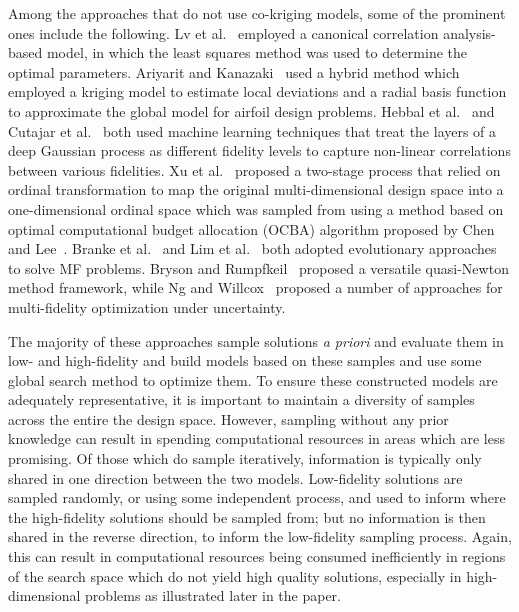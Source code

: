 Among the approaches that do not use co-kriging models, some of the prominent ones include the following. Lv et al.~\cite{lv2021multi} employed a canonical correlation analysis-based model, in which the least squares method was used to determine the optimal parameters. Ariyarit and Kanazaki~\cite{ariyarit2017multi} used a hybrid method which employed a kriging model to estimate local deviations and a radial basis function to approximate the global model for airfoil design problems. Hebbal et al.~\cite{hebbal2021multi} and Cutajar et al.~\cite{cutajar2019deep} both used machine learning techniques that treat the layers of a deep Gaussian process as different fidelity levels to capture non-linear correlations between various fidelities. Xu et al.~\cite{xu2016mo2tos} proposed a two-stage process that relied on ordinal transformation to map the original multi-dimensional design space into a one-dimensional ordinal space which was sampled from using a method based on optimal computational budget allocation (OCBA) algorithm proposed by Chen and Lee~\cite{chen2011stochastic}. Branke et al.~\cite{branke2016efficient} and Lim et al.~\cite{lim2008evolutionary} both adopted evolutionary approaches to solve MF problems. Bryson and Rumpfkeil~\cite{bryson2018multifidelity} proposed a versatile quasi-Newton method framework, while Ng and Willcox~\cite{ng2014multifidelity} proposed a number of approaches for multi-fidelity optimization under uncertainty.

The majority of these approaches sample solutions \emph{a priori} and evaluate them in low- and high-fidelity and build models based on these samples and use some global search method to optimize them. To ensure these constructed models are adequately representative, it is important to maintain a diversity of samples across the entire the design space. However, sampling without any prior knowledge can result in spending computational resources in areas which are less promising. Of those which do sample iteratively, information is typically only shared in one direction between the two models. Low-fidelity solutions are sampled randomly, or using some independent process, and used to inform where the high-fidelity solutions should be sampled from; but no information is then shared in the reverse direction, to inform the low-fidelity sampling process. Again, this can result in computational resources being consumed inefficiently in regions of the search space which do not yield high quality solutions, especially in high-dimensional problems as illustrated later in the paper. 

